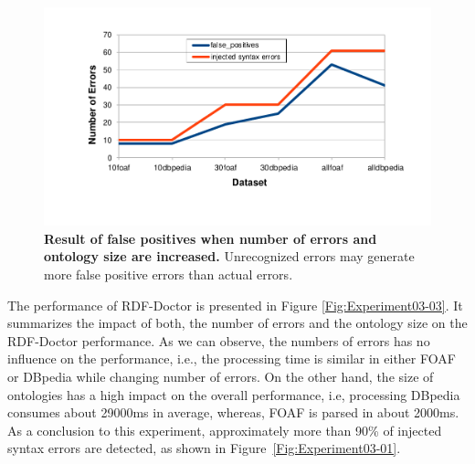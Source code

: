\begin{figure}[ht]
\begin{center}
		\includegraphics[scale=0.8,angle=0]{images/Experiment03-02.pdf}
		\setlength\belowcaptionskip{-5mm}
		\setlength\abovecaptionskip{-10mm}
		\caption{\textbf{Result of false positives when number of errors and ontology size are increased.} Unrecognized errors may generate more false positive errors than actual errors. 
		}
   \label{Fig:Experiment03-02}
\end{center}
\end{figure}

The performance of RDF-Doctor is presented in Figure \ref{Fig:Experiment03-03}. 
It summarizes the impact of both, the number of errors and the ontology size on the RDF-Doctor performance.
As we can observe, the numbers of errors has no influence on the performance, i.e., the processing time is similar in either FOAF or DBpedia while changing number of errors. 
On the other hand, the size of ontologies has a high impact on the overall performance, i.e, processing DBpedia consumes about 29000ms in average, whereas, FOAF is parsed in about 2000ms.   
As a conclusion to this experiment, approximately more than 90\% of injected syntax errors are detected, as shown in Figure~\ref{Fig:Experiment03-01}. 

